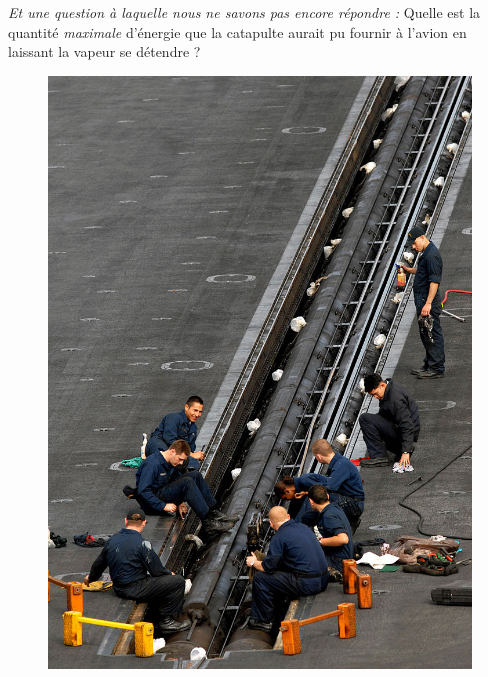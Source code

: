 	\textit{Et une question à laquelle nous ne savons pas encore répondre :} Quelle est la quantité \emph{maximale} d’énergie que la catapulte aurait pu fournir à l’avion en laissant la vapeur se détendre ?
	
	\begin{figure}[htc]
		\begin{center}
			\includegraphics[width=0.6\columnwidth]{images/catapulte_vapeur_1.jpg}
			\onlyframabook{\vspace{-0.6cm}}%
		\end{center}
		\label{fig_exo_catapulte_1}
	\end{figure}
